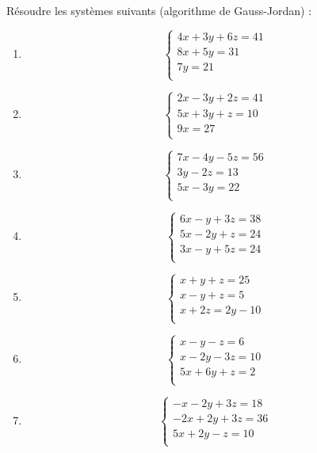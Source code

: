 \begin{exercice}
Résoudre les systèmes suivants (algorithme de Gauss-Jordan) : 
\begin{multicols}{2}
\begin{enumerate}
\item $$\left\{ \begin{array}{l}
    4x+3y+6z=41 \\ 
   8x+5y=31 \\ 
   7y=21 \\ 
\end{array} \right.$$

\item $$\left\{ \begin{array}{l}
    2x-3y+2z=41 \\ 
   5x+3y+z=10 \\ 
   9x=27 \\ 
\end{array} \right.$$

\item $$\left\{ \begin{array}{l}
    7x-4y-5z=56 \\ 
   3y-2z=13 \\ 
   5x-3y=22 \\ 
\end{array} \right.$$

\item $$\left\{ \begin{array}{l}
    6x-y+3z=38 \\ 
   5x-2y+z=24 \\ 
   3x-y+5z=24 \\ 
\end{array} \right.$$

\item $$\left\{ \begin{array}{l}
    x+y+z=25 \\ 
   x-y+z=5 \\ 
   x+2z=2y-10 \\ 
\end{array} \right.$$

\item $$\left\{ \begin{array}{l}
    x-y-z=6 \\ 
   x-2y-3z=10 \\ 
   5x+6y+z=2 \\ 
\end{array} \right.$$

\item $$\left\{ \begin{array}{l}
    -x-2y+3z=18 \\ 
   -2x+2y+3z=36 \\ 
   5x+2y-z=10 \\ 
\end{array} \right.$$


\end{enumerate}
\end{multicols}
\end{exercice}
